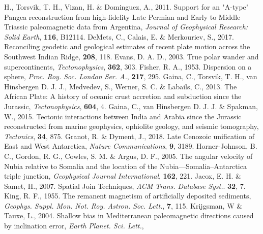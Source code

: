 \begin{thebibliography}{}
  H., Torsvik, T. H., Vizan, H. \& Dominguez, A., 2011. Support for an "A-type"
  Pangea reconstruction from high-fidelity Late Permian and Early to Middle
  Triassic paleomagnetic data from Argentina, \textit{Journal of Geophysical
  Research: Solid Earth}, \textbf{116}, B12114.
  DeMets, C., Calais, E. \& Merkouriev, S., 2017. Reconciling geodetic and
  geological estimates of recent plate motion across the Southwest Indian Ridge,
  \gji{}\textbf{208}, 118.
  Evans, D. A. D., 2003. True polar wander and supercontinents,
  \textit{Tectonophysics}, \textbf{362}, 303.
  Fisher, R. A., 1953. Dispersion on a sphere, \textit{Proc. Roy. Soc. London
  Ser. A.}, \textbf{217}, 295.
  Gaina, C., Torsvik, T. H., van Hinsbergen D. J. J., Medvedev, S., Werner, S.
  C. \& Labails, C., 2013. The African Plate: A history of oceanic crust
  accretion and subduction since the Jurassic, \textit{Tectonophysics},
  \textbf{604}, 4.
  Gaina, C., van Hinsbergen D. J. J. \& Spakman, W., 2015. Tectonic interactions
  between India and Arabia since the Jurassic reconstructed from marine
  geophysics, ophiolite geology, and seismic tomography, \textit{Tectonics},
  \textbf{34}, 875.
  Granot, R. \& Dyment, J., 2018. Late Cenozoic unification of East and West
  Antarctica, \textit{Nature Communications}, \textbf{9}, 3189.
  Horner-Johnson, B. C., Gordon, R. G., Cowles, S. M. \& Argus, D. F., 2005.
  The angular velocity of Nubia relative to Somalia and the location of the
  Nubia—Somalia–Antarctica triple junction, \textit{Geophysical Journal
  International}, \textbf{162}, 221.
  Jacox, E. H. \& Samet, H., 2007. Spatial Join Techniques, \textit{ACM Trans.
  Database Syst.}. \textbf{32}, 7.
  King, R. F., 1955. The remanent magnetism of artificially deposited sediments,
  \textit{Geophys. Suppl. Mon. Not. Roy. Astron. Soc. Lett.}, \textbf{7},
  115.
  Krijgsman, W \& Tauxe, L., 2004. Shallow bias in Mediterranean paleomagnetic
  directions caused by inclination error, \textit{Earth Planet. Sci. Lett.},

\end{thebibliography}
